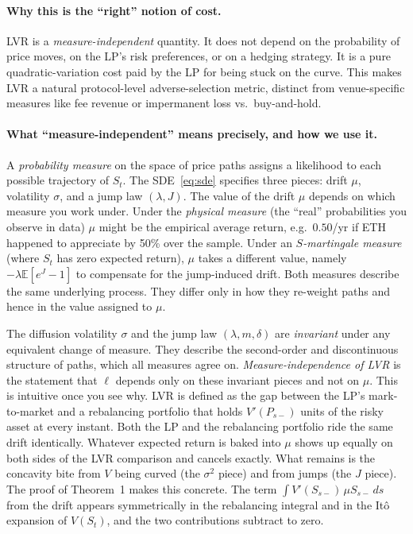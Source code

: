 \documentclass[11pt]{article}
\theoremstyle{definition}
\theoremstyle{remark}
\newcommand{\E}{\mathbb{E}}
\newcommand{\1}{\mathbf{1}}
\begin{document}
\paragraph{Why this is the ``right'' notion of cost.}
LVR is a \emph{measure-independent} quantity. It does not depend on the probability of price moves, on the LP's risk preferences, or on a hedging strategy. It is a pure quadratic-variation cost paid by the LP for being stuck on the curve. This makes LVR a natural protocol-level adverse-selection metric, distinct from venue-specific measures like fee revenue or impermanent loss vs.\ buy-and-hold.

\paragraph{What ``measure-independent'' means precisely, and how we use it.}
A \emph{probability measure} on the space of price paths assigns a likelihood to each possible trajectory of $S_t$. The SDE~\eqref{eq:sde} specifies three pieces: drift $\mu$, volatility $\sigma$, and a jump law $(\lambda, J)$. The value of the drift $\mu$ depends on which measure you work under. Under the \emph{physical measure} (the ``real'' probabilities you observe in data) $\mu$ might be the empirical average return, e.g.\ $0.50$/yr if ETH happened to appreciate by 50\% over the sample. Under an \emph{$S$-martingale measure} (where $S_t$ has zero expected return), $\mu$ takes a different value, namely $-\lambda \E[e^J - 1]$ to compensate for the jump-induced drift. Both measures describe the same underlying process. They differ only in how they re-weight paths and hence in the value assigned to $\mu$.

The diffusion volatility $\sigma$ and the jump law $(\lambda, m, \delta)$ are \emph{invariant} under any equivalent change of measure. They describe the second-order and discontinuous structure of paths, which all measures agree on. \emph{Measure-independence of LVR} is the statement that $\ell$ depends only on these invariant pieces and not on $\mu$. This is intuitive once you see why. LVR is defined as the gap between the LP's mark-to-market and a rebalancing portfolio that holds $V'(P_{s-})$ units of the risky asset at every instant. Both the LP and the rebalancing portfolio ride the same drift identically. Whatever expected return is baked into $\mu$ shows up equally on both sides of the LVR comparison and cancels exactly. What remains is the concavity bite from $V$ being curved (the $\sigma^2$ piece) and from jumps (the $J$ piece). The proof of Theorem~1 makes this concrete. The term $\int V'(S_{s-})\,\mu S_{s-}\,ds$ from the drift appears symmetrically in the rebalancing integral and in the Itô expansion of $V(S_t)$, and the two contributions subtract to zero.
\end{document}
